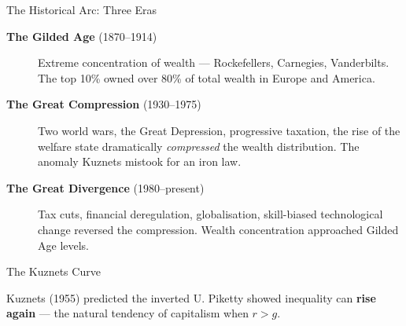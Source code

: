 \documentclass[aspectratio=169, 10pt]{beamer}
\begin{document}
\begin{frame}{The Historical Arc: Three Eras}
\begin{description}
  \item[\textbf{The Gilded Age} (1870--1914)]
    Extreme concentration of wealth --- Rockefellers, Carnegies, Vanderbilts.
    The top 10\% owned over 80\% of total wealth in Europe and America.
  \item[\textbf{The Great Compression} (1930--1975)]
    Two world wars, the Great Depression, progressive taxation,
    the rise of the welfare state dramatically \textit{compressed}
    the wealth distribution. The anomaly Kuznets mistook for an iron law.
  \item[\textbf{The Great Divergence} (1980--present)]
    Tax cuts, financial deregulation, globalisation, skill-biased
    technological change reversed the compression.
    Wealth concentration approached Gilded Age levels.
\end{description}
\end{frame}

\begin{frame}{The Kuznets Curve}
\begin{center}
\end{center}
\vspace{0.3em}
Kuznets (1955) predicted the inverted U. Piketty showed inequality
can \textbf{rise again} --- the natural tendency of capitalism when $r > g$.
\end{frame}
\end{document}
